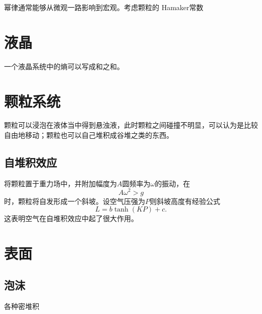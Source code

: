 幂律通常能够从微观一路影响到宏观。考虑颗粒的
Hamaker常数

\chapter{液晶}

一个液晶系统中的熵可以写成和之和。

\chapter{颗粒系统}

颗粒可以浸泡在液体当中得到悬浊液，此时颗粒之间碰撞不明显，可以认为是比较自由地移动；颗粒也可以自己堆积成谷堆之类的东西。

\section{自堆积效应}

将颗粒置于重力场中，并附加幅度为$A$圆频率为$\omega$的振动，在
\begin{equation}
    A \omega^2 > g
\end{equation}
时，颗粒将自发形成一个斜坡。设空气压强为$P$则斜坡高度有经验公式
\begin{equation}
    L = b \tanh(KP) + c.
\end{equation}
这表明空气在自堆积效应中起了很大作用。

\chapter{表面}

\section{泡沫}

各种密堆积